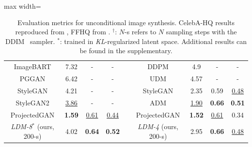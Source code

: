 {\begin{table}[t]
\begin{footnotesize}
\begin{adjustbox}{max width=\linewidth}
\begin{tabular}{c c c c c c c c c}
    ImageBART\cite{DBLP:journals/corr/abs-2108-08827} & 7.32 & - & - & &  DDPM \cite{DBLP:conf/nips/HoJA20} &4.9 &- &- \\
    PGGAN \cite{DBLP:journals/corr/abs-1710-10196} & 6.42 & - & - & & UDM \cite{DBLP:journals/corr/abs-2106-05527} & 4.57 & -&-\\
    StyleGAN\cite{stylegan} & 4.21 & - & - & &  StyleGAN\cite{stylegan} & 2.35 & 0.59 &  \underline{0.48} \\
    StyleGAN2\cite{DBLP:journals/corr/abs-1912-04958} & \underline{3.86} & - & - &  & ADM \cite{DBLP:journals/corr/abs-2105-05233} & \underline{1.90} & \textbf{0.66} & \textbf{0.51} \\
    ProjectedGAN\cite{DBLP:journals/corr/abs-2111-01007} & \textbf{1.59} & \underline{0.61} & \underline{0.44} & & ProjectedGAN\cite{DBLP:journals/corr/abs-2111-01007} & \textbf{1.52} & \underline{0.61} & 0.34\\
    \midrule
    \emph{LDM-8}$^*$ (ours, 200-s) & 4.02 & \textbf{0.64} & \textbf{0.52} & & \emph{LDM-4} (ours, 200-s) & 2.95 & \textbf{0.66} & \underline{0.48} \\
    \bottomrule
  \end{tabular}
  \end{adjustbox}\vspace{-2.6em}
\end{footnotesize}
  \caption{\label{tab:fids} Evaluation metrics for unconditional image
  synthesis. CelebA-HQ results reproduced from
  \cite{DBLP:conf/cvpr/ParmarLLT21,DBLP:conf/iclr/XiaoKKV21,DBLP:journals/corr/abs-2106-05527},
  FFHQ from
  \cite{DBLP:journals/corr/abs-1912-04958,DBLP:journals/corr/abs-2106-05527}. $^\dagger$: $N$-s refers to $N$ sampling steps with the DDIM~\cite{DBLP:conf/iclr/SongME21} sampler. $^*$: trained in \emph{KL}-regularized latent space.
  Additional results can be found in the supplementary.\vspace{-1.6em}}
\end{table}
}




